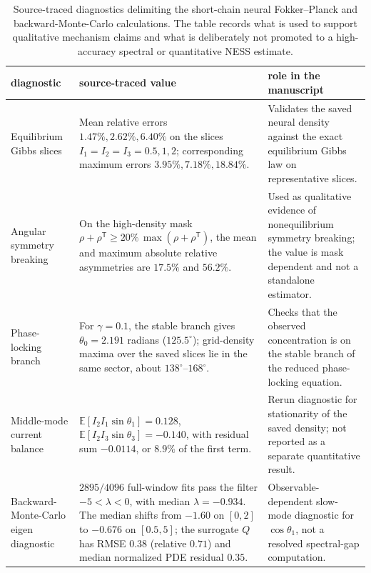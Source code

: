 \documentclass[11pt,a4paper]{article}
\theoremstyle{definition}
\newcommand{\E}{\mathbb{E}}
\numberwithin{equation}{section}   %
\begin{document}
\begin{table}[ht]\centering
\small
\begin{tabular}{>{\raggedright\arraybackslash}p{}
                >{\raggedright\arraybackslash}p{}
                >{\raggedright\arraybackslash}p{}}
\toprule
diagnostic & source-traced value & role in the manuscript \\
\midrule
Equilibrium Gibbs slices &
Mean relative errors $1.47\%,2.62\%,6.40\%$ on the slices
$I_1=I_2=I_3=0.5,1,2$; corresponding maximum errors
$3.95\%,7.18\%,18.84\%$. &
Validates the saved neural density against the exact equilibrium Gibbs law on
representative slices. \\
\midrule
Angular symmetry breaking &
On the high-density mask
$\rho+\rho^{\mathsf T}\ge 20\%\,\max(\rho+\rho^{\mathsf T})$, the mean and
maximum absolute relative asymmetries are $17.5\%$ and $56.2\%$. &
Used as qualitative evidence of nonequilibrium symmetry breaking; the value is
mask dependent and not a standalone estimator. \\
\midrule
Phase-locking branch &
For $\gamma=0.1$, the stable branch gives
$\theta_0=2.191$ radians ($125.5^\circ$); grid-density maxima over the saved
slices lie in the same sector, about $138^\circ$--$168^\circ$. &
Checks that the observed concentration is on the stable branch of the reduced
phase-locking equation. \\
\midrule
Middle-mode current balance &
$\E[I_2I_1\sin\theta_1]=0.128$,
$\E[I_2I_3\sin\theta_3]=-0.140$, with residual sum $-0.0114$,
or $8.9\%$ of the first term. &
Rerun diagnostic for stationarity of the saved density; not reported as a
separate quantitative result. \\
\midrule
Backward-Monte-Carlo eigen diagnostic &
$2895/4096$ full-window fits pass the filter $-5<\lambda<0$, with median
$\lambda=-0.934$. The median shifts from $-1.60$ on $[0,2]$ to $-0.676$ on
$[0.5,5]$; the surrogate $Q$ has RMSE $0.38$ (relative $0.71$) and median
normalized PDE residual $0.35$. &
Observable-dependent slow-mode diagnostic for $\cos\theta_1$, not a resolved
spectral-gap computation. \\
\bottomrule
\end{tabular}
\caption{Source-traced diagnostics delimiting the short-chain neural
Fokker--Planck and backward-Monte-Carlo calculations. The table records what is
used to support qualitative mechanism claims and what is deliberately not
promoted to a high-accuracy spectral or quantitative NESS estimate.}
\label{tab:short-chain-diagnostics}
\end{table}
\end{document}
